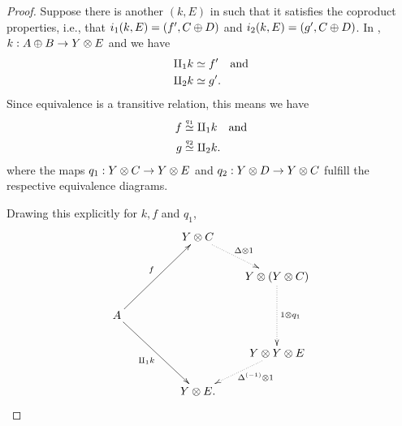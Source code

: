 \begin{proof}
  Suppose there is another $(k,E)$ in \Xt such that it satisfies the coproduct properties, i.e.,
  that $i_1 (k,E) = (f',C\oplus D)$ and $i_2 (k,E) = (g',C\oplus D)$. In \X, $k:A\oplus B \to Y \otimes E$ and we have
  \begin{align*}
    \amalg_{1} k &\overset{\scriptscriptstyle }{\simeq} f'\quad\text{and}\\
    \amalg_{2} k &\overset{\scriptscriptstyle }{\simeq} g'.
  \end{align*}
  Since equivalence is a transitive relation, this means we have
  \begin{align*}
    f &\overset{\scriptscriptstyle q_1}{\simeq} \amalg_{1} k\quad\text{and}\\
    g &\overset{\scriptscriptstyle q_2}{\simeq} \amalg_{2} k.
  \end{align*}
  where the maps $q_1: Y\otimes C \to Y\otimes E$ and $q_2:Y\otimes D \to Y\otimes C$ fulfill the respective equivalence diagrams.

  Drawing this explicitly for $k, f$ and $q_1$,
  \[
    \xymatrix @C=20pt @R=20pt{
      & & Y \* C \ar@{.>}[dr]^{\Delta\* 1}\\
      & & & Y \* (Y\* C) \ar@{.>}[dd]^{1\*q_1}\\
      A \ar[uurr]^{f} \ar[ddrr]_{\cpa k} \\
      & & & Y \* Y\*E \ar@{.>}[dl]^(.4){\inv{\Delta}\* 1}\\
      && Y\*E.
    }
  \]






\end{proof}
